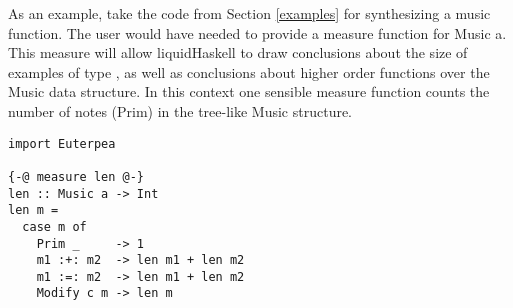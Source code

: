 
As an example, take the code from Section \ref{examples} for synthesizing a music function.
The user would have needed to provide a measure function for Music a.
This measure will allow liquidHaskell to draw conclusions about the size of examples of type , as well as conclusions about higher order functions over the Music data structure.
In this context one sensible measure function counts the number of notes (Prim) in the tree-like Music structure.

\begin{lstlisting}[caption=a user defined measure over a datatype]
import Euterpea

{-@ measure len @-}
len :: Music a -> Int
len m =
  case m of
    Prim _     -> 1
    m1 :+: m2  -> len m1 + len m2
    m1 :=: m2  -> len m1 + len m2
    Modify c m -> len m
\end{lstlisting}



